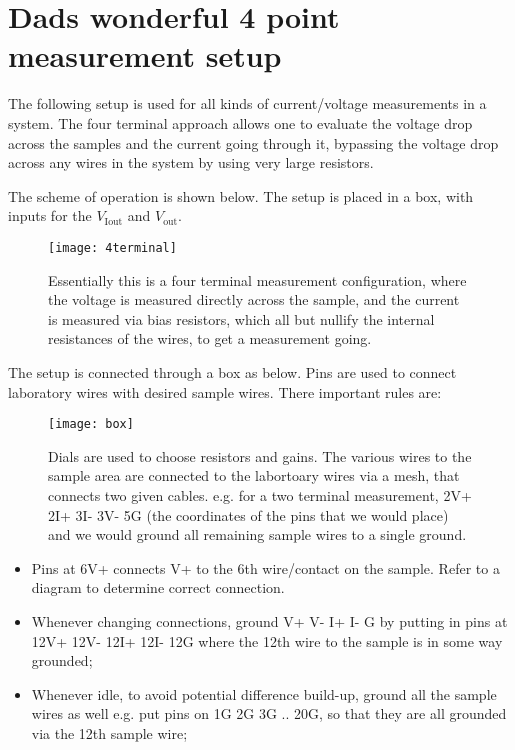 \section{Dads wonderful 4 point measurement setup}
  The following setup is used for all kinds of current/voltage measurements in a system. The four terminal approach allows one to evaluate the voltage drop across the samples and the current going through it, bypassing the voltage drop across any wires in the system by using very large resistors.
  
  The scheme of operation is shown below. The setup is placed in a box, with inputs for the $ V_\text{Iout} $ and $ V_\text{out} $.
  
  \begin{figure}[h]
  	\centering
  	\texttt{[image: 4terminal]}
  	\caption{Essentially this is a four terminal measurement configuration, where the voltage is measured directly across the sample, and the current is measured via bias resistors, which all but nullify the internal resistances of the wires, to get a measurement going.}
  	\label{fig:4t}
  \end{figure}

  The setup is connected through a box as below. Pins are used to connect laboratory wires with desired sample wires. There important rules are:
  

  \begin{figure}[h]
  	\centering
  	\texttt{[image: box]}
  	\caption{Dials are used to choose resistors and gains. The various wires to the sample area are connected to the labortoary wires via a mesh, that connects two given cables. e.g. for a two terminal measurement, 2V+ 2I+ 3I- 3V- 5G (the coordinates of the pins that we would place) and we would ground all remaining sample wires to a single ground. }
  	\label{fig:box}
  \end{figure}
    \begin{itemize}
  	\item Pins at 6V+ connects V+ to the 6th wire/contact on the sample. Refer to a diagram to determine correct connection.
  	\item Whenever changing connections, ground V+ V- I+ I- G by putting in pins at 12V+ 12V- 12I+ 12I- 12G where the 12th wire to the sample is in some way grounded;
  	\item Whenever idle, to avoid potential difference build-up, ground all the sample wires as well e.g. put pins on 1G 2G 3G .. 20G, so that they are all grounded via the 12th sample wire;
  \end{itemize}
  \newpage
  
